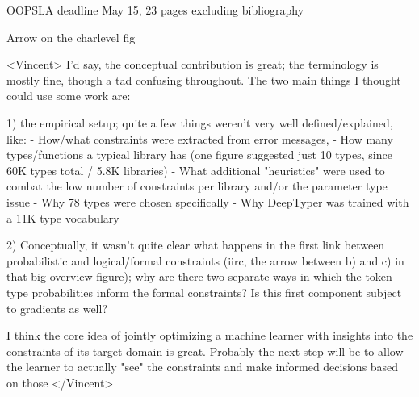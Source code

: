  
OOPSLA deadline May 15, 23 pages excluding bibliography

Arrow on the charlevel fig

<Vincent>
I'd say, the conceptual contribution is great; the terminology is mostly
fine, though a tad confusing throughout. The two main things I thought could
use some work are:

1) the empirical setup; quite a few things weren't very well
defined/explained, like:
  - How/what constraints were extracted from error messages,
  - How many types/functions a typical library has (one figure suggested
just 10 types, since 60K types total / 5.8K libraries)
  - What additional "heuristics" were used to combat the low number of
constraints per library and/or the parameter type issue
  - Why 78 types were chosen specifically
  - Why DeepTyper was trained with a 11K type vocabulary
  
2) Conceptually, it wasn't quite clear what happens in the first link
between probabilistic and logical/formal constraints (iirc, the arrow
between b) and c) in that big overview figure); why are there two separate
ways in which the token-type probabilities inform the formal constraints? Is
this first component subject to gradients as well?

I think the core idea of jointly optimizing a machine learner with insights
into the constraints of its target domain is great. Probably the next step
will be to allow the learner to actually "see" the constraints and make
informed decisions based on those </Vincent>
